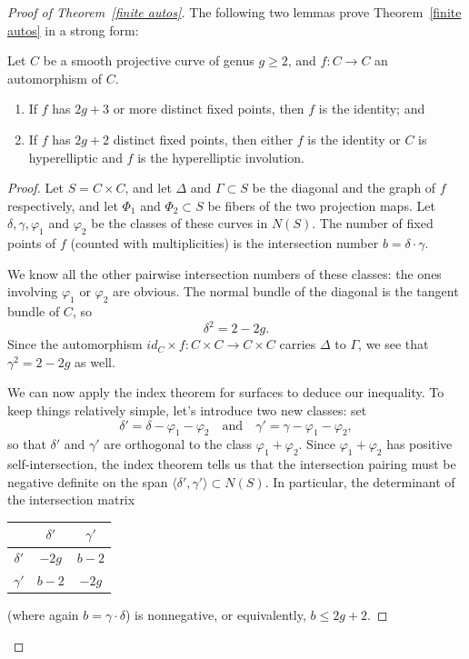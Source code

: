 \begin{proof}[Proof of Theorem~\ref{finite autos}]
 
The following two lemmas prove Theorem~\ref{finite autos} in a strong form:

\begin{lemma}Let $C$ be a smooth projective curve of genus $g \geq 2$, and $f: C \to C$ an automorphism of $C$.
\begin{enumerate}
\item If $f$ has $2g+3$ or more distinct fixed points, then $f$ is the identity; and
\item If $f$ has $2g+2$ distinct fixed points, then either $f$ is the identity or $C$ is hyperelliptic and $f$ is the hyperelliptic involution.
\end{enumerate}
\end{lemma}

\begin{proof}
Let $S = C\times C$, and let $\Delta$ and $\Gamma \subset S$ be the diagonal and the graph of $f$ respectively, and let $\Phi_1$ and $\Phi_2 \subset S$ be fibers of the two projection maps. Let $\delta, \gamma, \varphi_1$ and $\varphi_2$ be the classes of these curves in  $N(S)$. The number of fixed points of $f$ (counted with multiplicities) is the intersection number  $b = \delta \cdot \gamma$.

We know all the other pairwise intersection numbers of these classes: the ones involving $\varphi_1$ or $\varphi_2$ are obvious. The normal bundle of the diagonal is the tangent bundle of $C$, so
$$
\delta^2 = 2 - 2g.
$$
Since the automorphism $id_C \times f : C\times C \to C \times C$ carries $\Delta$ to $\Gamma$, we see that $\gamma^2 = 2-2g$ as well.

We can now apply the index theorem for surfaces to deduce our inequality. To keep things relatively simple, let's introduce two new classes: set
$$
\delta' = \delta - \varphi_1 - \varphi_2 \quad \text{and} \quad \gamma' = \gamma - \varphi_1 - \varphi_2,
$$
so that $\delta'$ and $\gamma'$ are orthogonal to the class $\varphi_1 + \varphi_2$. Since $\varphi_1 + \varphi_2$ has positive self-intersection, the index theorem  tells us that the intersection pairing must be negative definite on the span $\langle \delta',\gamma' \rangle \subset N(S)$. In particular, the determinant of the intersection matrix
\begin{center}
\begin{tabular}{c|c|c}
& $\delta'$ &  $\gamma'$  \\
\hline
$\delta'$ & $-2g$ & $b-2$ \\
\hline
$\gamma'$ & $b-2$ & $-2g$ 
\end{tabular}
\end{center}
(where again $b = \gamma \cdot \delta$) is nonnegative, or equivalently, $b\leq 2g+2$.
\end{proof}


\end{proof}
